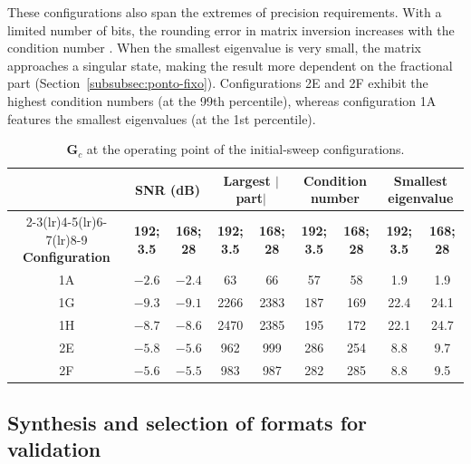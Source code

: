 These configurations also span the extremes of precision requirements. With a limited number of bits, the rounding error in matrix inversion increases with the condition number \cite[p.~1603]{osinsky2023}. When the smallest eigenvalue is very small, the matrix approaches a singular state, making the result more dependent on the fractional part (Section~\ref{subsubsec:ponto-fixo}). Configurations 2E and 2F exhibit the highest condition numbers (at the 99th percentile), whereas configuration 1A features the smallest eigenvalues (at the 1st percentile).


\begin{table}[htbp]
\caption{$\mathbf{G}_c$ at the operating point of the initial-sweep configurations.}
\label{tab:gc-ponto-operacao}
\vspace{4pt} %
\centering
\footnotesize
\renewcommand{\arraystretch}{1.2}
\setlength{\tabcolsep}{4pt}
\begin{tabular}{ccccccccc}
\toprule
 & \multicolumn{2}{c}{\textbf{SNR (dB)}} & \multicolumn{2}{c}{\textbf{Largest} {\boldmath $|$}\textbf{part}{\boldmath $|$}} & \multicolumn{2}{c}{\textbf{Condition number}} & \multicolumn{2}{c}{\textbf{Smallest eigenvalue}} \\
\cmidrule(lr){2-3}\cmidrule(lr){4-5}\cmidrule(lr){6-7}\cmidrule(lr){8-9}
\textbf{Configuration} & \textbf{192; 3.5} & \textbf{168; 28} & \textbf{192; 3.5} & \textbf{168; 28} & \textbf{192; 3.5} & \textbf{168; 28} & \textbf{192; 3.5} & \textbf{168; 28} \\
\midrule
1A & $-2.6$ & $-2.4$ & 63   & 66   & 57  & 58  & 1.9  & 1.9 \\
1G & $-9.3$ & $-9.1$ & 2266 & 2383 & 187 & 169 & 22.4 & 24.1 \\
1H & $-8.7$ & $-8.6$ & 2470 & 2385 & 195 & 172 & 22.1 & 24.7 \\
2E & $-5.8$ & $-5.6$ & 962  & 999  & 286 & 254 & 8.8  & 9.7 \\
2F & $-5.6$ & $-5.5$ & 983  & 987  & 282 & 285 & 8.8  & 9.5 \\
\bottomrule
\end{tabular}
\vspace{4pt}

\end{table}

\subsection{\texorpdfstring{Synthesis and selection of formats for validation}{Synthesis and selection of formats for validation}}

